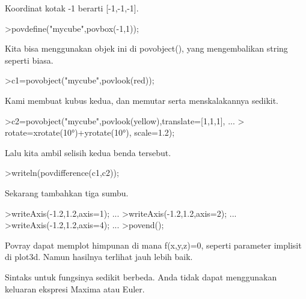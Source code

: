\documentclass{article}
\begin{document}
\begin{eulernotebook}
\begin{eulercomment}
\begin{eulercomment}
\begin{eulercomment}
\begin{eulercomment}
\begin{eulercomment}
\begin{eulercomment}
\begin{eulercomment}
\begin{eulercomment}
\begin{eulercomment}
\begin{eulercomment}
\begin{eulercomment}
\begin{eulercomment}
\begin{eulercomment}
\begin{eulercomment}
\begin{eulercomment}
\begin{eulercomment}
\begin{eulercomment}
Koordinat kotak -1 berarti [-1,-1,-1].
\end{eulercomment}
\begin{eulerprompt}
>povdefine("mycube",povbox(-1,1));
\end{eulerprompt}
\begin{eulercomment}
Kita bisa menggunakan objek ini di povobject(), yang mengembalikan
string seperti biasa.
\end{eulercomment}
\begin{eulerprompt}
>c1=povobject("mycube",povlook(red));
\end{eulerprompt}
\begin{eulercomment}
Kami membuat kubus kedua, dan memutar serta menskalakannya sedikit.
\end{eulercomment}
\begin{eulerprompt}
>c2=povobject("mycube",povlook(yellow),translate=[1,1,1], ...
>  rotate=xrotate(10°)+yrotate(10°), scale=1.2);
\end{eulerprompt}
\begin{eulercomment}
Lalu kita ambil selisih kedua benda tersebut.
\end{eulercomment}
\begin{eulerprompt}
>writeln(povdifference(c1,c2));
\end{eulerprompt}
\begin{eulercomment}
Sekarang tambahkan tiga sumbu.
\end{eulercomment}
\begin{eulerprompt}
>writeAxis(-1.2,1.2,axis=1); ...
>writeAxis(-1.2,1.2,axis=2); ...
>writeAxis(-1.2,1.2,axis=4); ...
>povend();
\end{eulerprompt}
\begin{eulercomment}
Povray dapat memplot himpunan di mana f(x,y,z)=0, seperti parameter
implisit di plot3d. Namun hasilnya terlihat jauh lebih baik.

Sintaks untuk fungsinya sedikit berbeda. Anda tidak dapat menggunakan
keluaran ekspresi Maxima atau Euler.


\end{eulercomment}
\end{eulercomment}
\end{eulercomment}
\end{eulercomment}
\end{eulercomment}
\end{eulercomment}
\end{eulercomment}
\end{eulercomment}
\end{eulercomment}
\end{eulercomment}
\end{eulercomment}
\end{eulercomment}
\end{eulercomment}
\end{eulercomment}
\end{eulercomment}
\end{eulercomment}
\end{eulercomment}
\end{eulernotebook}
\end{document}
